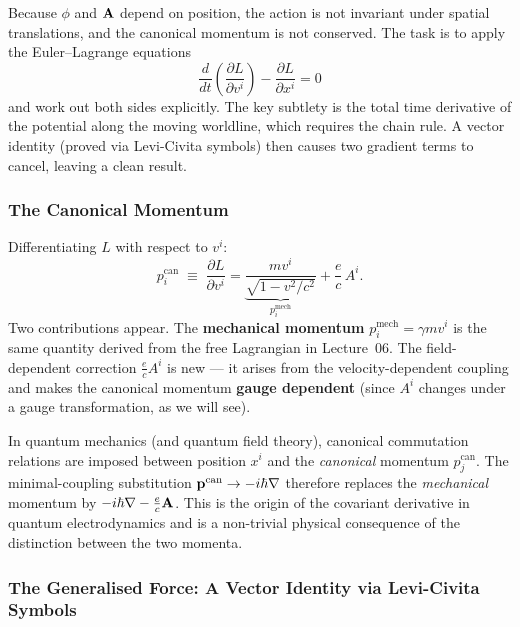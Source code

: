 Because $\phi$ and $\mathbf{A}$ depend on position, the action is not invariant
under spatial translations, and the canonical momentum is not conserved.  The
task is to apply the Euler--Lagrange equations
\begin{equation}\label{eq:lec07:EL}
    \frac{d}{dt}\!\left(\frac{\partial L}{\partial v^i}\right) - \frac{\partial L}{\partial x^i} = 0
\end{equation}
and work out both sides explicitly.  The key subtlety is the total time
derivative of the potential along the moving worldline, which requires the
chain rule.  A vector identity (proved via Levi-Civita symbols) then causes
two gradient terms to cancel, leaving a clean result.

\subsubsection*{The Canonical Momentum}

Differentiating $L$ with respect to $v^i$:
\begin{equation}\label{eq:lec07:canonical-momentum}
    p_i^{\text{can}} \;\equiv\; \frac{\partial L}{\partial v^i}
    = \underbrace{\frac{mv^i}{\sqrt{1-v^2/c^2}}}_{\displaystyle p_i^{\text{mech}}}
      + \frac{e}{c}\,A^i .
\end{equation}
Two contributions appear.  The \textbf{mechanical momentum}
$p_i^{\text{mech}} = \gamma mv^i$ is the same quantity derived from the free
Lagrangian in Lecture~06.  The field-dependent correction $\tfrac{e}{c}A^i$
is new — it arises from the velocity-dependent coupling and makes the canonical
momentum \textbf{gauge dependent} (since $A^i$ changes under a gauge
transformation, as we will see).

\begin{remark}
In quantum mechanics (and quantum field theory), canonical commutation
relations are imposed between position $x^i$ and the \emph{canonical} momentum
$p_j^{\text{can}}$.  The minimal-coupling substitution
$\mathbf{p}^{\text{can}}\to -i\hbar\nabla$ therefore replaces the
\emph{mechanical} momentum by $-i\hbar\nabla - \tfrac{e}{c}\mathbf{A}$.  This is
the origin of the covariant derivative in quantum electrodynamics and is
a non-trivial physical consequence of the distinction between the two momenta.
\end{remark}

\subsubsection*{The Generalised Force: A Vector Identity via Levi-Civita Symbols}

